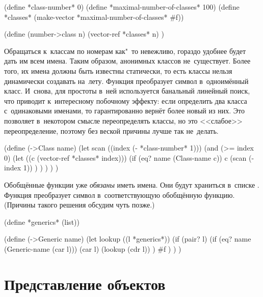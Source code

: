 \begin{code:lisp}
(define *class-number* 0)
(define *maximal-number-of-classes* 100)
(define *classes* (make-vector *maximal-number-of-classes* #f))

(define (number->class n)
  (vector-ref *classes* n) )
\end{code:lisp}

Обращаться к~классам по номерам как"~то невежливо, гораздо удобнее будет дать им
всем имена. Таким образом, анонимных классов не~существует. Более того, их имена
должны быть известны статически, то есть классы нельзя динамически создавать
на~лету. Функция  преобразует символ в~одноимённый класс. И~снова,
для простоты в~ней используется банальный линейный поиск, что приводит
к~интересному побочному эффекту: если определить два класса с~одинаковыми
именами, то  гарантированно вернёт более новый из них. Это позволяет
в~некотором смысле переопределять классы, но это <<слабое>> переопределение,
поэтому без веской причины лучше так не~делать.

\begin{code:lisp}
(define (->Class name)
  (let scan ((index (- *class-number* 1)))
    (and (>= index 0)
         (let ((c (vector-ref *classes* index)))
           (if (eq? name (Class-name c))
               c
               (scan (- index 1)) ) ) ) ) )
\end{code:lisp}

Обобщённые функции уже \emph{обязаны} иметь имена. Они будут храниться в~списке
. Функция  преобразует символ в~соответствующую
обобщённую функцию. (Причины такого решения обсудим чуть позже.)

\begin{code:lisp}
(define *generics* (list))

(define (->Generic name)
  (let lookup ((l *generics*))
    (if (pair? l)
        (if (eq? name (Generic-name (car l)))
            (car l)
            (lookup (cdr l)) )
        #f ) ) )
\end{code:lisp}


\section{Представление объектов}\label{objects/sect:repr-obj}

